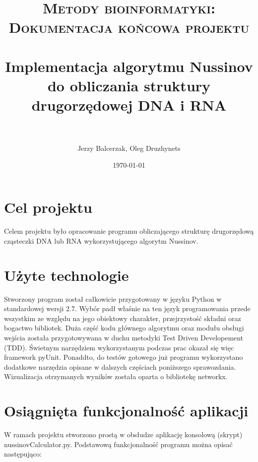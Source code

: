 \documentclass[paper=a4, fontsize=11pt]{scrartcl} %
\title{	
\normalfont \normalsize 
\textsc{Metody bioinformatyki: Dokumentacja końcowa projektu} \\ [25pt] %
\horrule{0.5pt} \\[0.4cm] %
\huge Implementacja algorytmu Nussinov do obliczania struktury drugorzędowej DNA i RNA \\ %
\horrule{2pt} \\[0.5cm] %
}
\author{Jerzy Balcerzak,
Oleg Druzhynets} %
\date{\normalsize\today} %
\numberwithin{equation}{section} %
\numberwithin{figure}{section} %
\numberwithin{table}{section} %
\begin{document}
\maketitle %


\section{Cel projektu}

	Celem projektu było opracowanie programu obliczającego strukturę drugorzędową cząsteczki DNA lub RNA wykorzystującego algorytm Nussinov.





\section{Użyte technologie}

Stworzony program został całkowicie przygotowany w języku Python w standardowej wersji 2.7. Wybór padł właśnie na ten język programowania przede wszystkim ze względu na jego obiektowy charakter, przejrzystość składni oraz bogactwo bibliotek. Duża część kodu głównego algorytmu oraz modułu obsługi wejścia została przygotowywana w duchu metodyki Test Driven Developement (TDD). Świetnym narzędziem wykorzystanym podczas prac okazał się więc framework pyUnit. Ponaddto, do testów gotowego już programu wykorzystano dodatkowe narzędzia opisane w dalszych częściach poniższego sprawozdania. Wizualizacja otrzymanych wyników została oparta o bibliotekę networkx.

\section{Osiągnięta funkcjonalność aplikacji}

W ramach projektu stworzono prostą w obsłudze aplikację konsolową (skrypt) \mbox{nussinovCalculator.py}. Podstawową funkcjonalność programu można opisać następująco:
\end{document}
